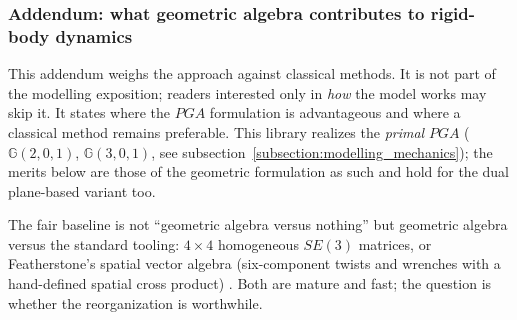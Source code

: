 \subsubsection{Addendum: what geometric algebra contributes to rigid-body dynamics}
\label{subsubsection:addendum_what_ga_buys}

This addendum weighs the approach against classical methods. It is not
part of the modelling exposition; readers interested only in \emph{how} the model works
may skip it. It states where the $PGA$ formulation is advantageous and where a classical
method remains preferable. This library realizes
the \emph{primal} $PGA$ ($\mathbb{G}(2,0,1)$, $\mathbb{G}(3,0,1)$, see
subsection~\ref{subsection:modelling_mechanics}); the merits below are those of the
geometric formulation as such and hold for the dual plane-based variant too.

The fair baseline is not ``geometric algebra versus nothing'' but geometric algebra versus
the standard tooling: $4\times4$ homogeneous $SE(3)$ matrices, or Featherstone's spatial
vector algebra (six-component twists and wrenches with a hand-defined spatial cross
product) \cite{Featherstone_rigid_body_dynamics:2008}. Both are mature and fast; the
question is whether the reorganization is worthwhile.

